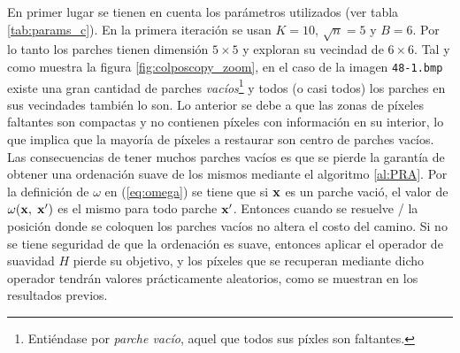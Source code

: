  En primer lugar se tienen en cuenta los par\'ametros utilizados (ver tabla \ref{tab:params_c}). En la primera iteraci\'on se usan $K=10$, $\sqrt{n}=5$ y $B=6$. Por lo tanto los parches tienen dimensi\'on $5 \times 5$ y exploran su vecindad de $6 \times 6$. Tal y como muestra la figura \ref{fig:colposcopy_zoom}, en el caso de la imagen \texttt{48-1.bmp} existe una gran cantidad de parches \textit{vac\'ios}\footnote{Enti\'endase por \textit{parche vac\'io}, aquel que todos sus p\'ixles son faltantes.} y todos (o casi todos) los parches en sus vecindades tambi\'en lo son. Lo anterior se debe a que las zonas de p\'ixeles faltantes son compactas y no contienen p\'ixeles con informaci\'on en su interior, lo que implica que la mayor\'ia de p\'ixeles a restaurar son centro de parches vac\'ios. Las consecuencias de tener muchos parches vac\'ios es que se pierde la garant\'ia de obtener una ordenaci\'on suave de los mismos mediante el algoritmo \ref{al:PRA}. Por la definici\'on de $\omega$ en (\ref{eq:omega}) se tiene que si $\mathbf{x}$ es un parche vaci\'o, el valor de $\omega(\mathbf{x},\; \mathbf{x}')$ es el mismo para todo parche $\mathbf{x}'$. Entonces cuando se resuelve \TSP/ la posici\'on donde se coloquen los parches vac\'ios no altera el costo del camino. Si no se tiene seguridad de que la ordenaci\'on es suave, entonces aplicar el operador de suavidad $H$ pierde su objetivo, y los p\'ixeles que se recuperan mediante dicho operador tendr\'an valores pr\'acticamente aleatorios, como se muestran en los resultados previos.
 
